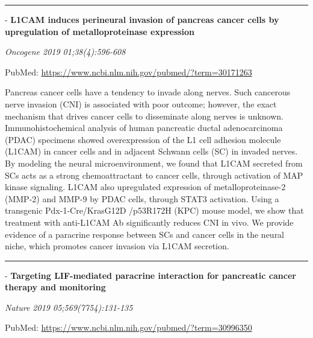 \documentclass[]{article}
\begin{document}
{}

{}

\begin{center}\rule{0.5\linewidth}{\linethickness}\end{center}

 - \textbf{L1CAM induces perineural invasion of pancreas cancer cells by
upregulation of metalloproteinase expression}

\emph{Oncogene 2019 01;38(4):596-608}

PubMed: \url{https://www.ncbi.nlm.nih.gov/pubmed/?term=30171263}

Pancreas cancer cells have a tendency to invade along nerves. Such
cancerous nerve invasion (CNI) is associated with poor outcome; however,
the exact mechanism that drives cancer cells to disseminate along nerves
is unknown. Immunohistochemical analysis of human pancreatic ductal
adenocarcinoma (PDAC) specimens showed overexpression of the L1 cell
adhesion molecule (L1CAM) in cancer cells and in adjacent Schwann cells
(SC) in invaded nerves. By modeling the neural microenvironment, we
found that L1CAM secreted from SCs acts as a strong chemoattractant to
cancer cells, through activation of MAP kinase signaling. L1CAM also
upregulated expression of metalloproteinase-2 (MMP-2) and MMP-9 by PDAC
cells, through STAT3 activation. Using a transgenic Pdx-1-Cre/KrasG12D
/p53R172H (KPC) mouse model, we show that treatment with anti-L1CAM Ab
significantly reduces CNI in vivo. We provide evidence of a paracrine
response between SCs and cancer cells in the neural niche, which
promotes cancer invasion via L1CAM secretion.

{}

{}

\begin{center}\rule{0.5\linewidth}{\linethickness}\end{center}

 - \textbf{Targeting LIF-mediated paracrine interaction for pancreatic
cancer therapy and monitoring}

\emph{Nature 2019 05;569(7754):131-135}

PubMed: \url{https://www.ncbi.nlm.nih.gov/pubmed/?term=30996350}
\end{document}
